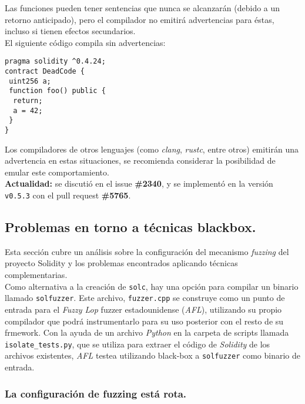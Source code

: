 Las funciones pueden tener sentencias que nunca se alcanzarán (debido a un retorno anticipado), pero el compilador no emitirá advertencias para éstas, incluso si tienen efectos secundarios.\\
 El siguiente código compila sin advertencias:

\begin{lstlisting}[language=Solidity, caption={Código de ejemplo para dead code}] 
pragma solidity ^0.4.24;
contract DeadCode {
 uint256 a;
 function foo() public {
  return;
  a = 42;
 }
}
\end{lstlisting}

Los compiladores de otros lenguajes (como \textit{clang}, \textit{rustc}, entre otros) emitirán una advertencia en estas situaciones, se recomienda considerar la posibilidad de emular este comportamiento.\\

\textbf{Actualidad:} se discutió en el issue \textbf{\#2340}\cite{GHI2340}, y se implementó en la versión \texttt{v0.5.3} con el pull request \textbf{\#5765}\cite{GHPR5765}.\\

\subsection{Problemas en torno a técnicas blackbox.}

Esta sección cubre un análisis sobre la configuración del mecanismo \textit{fuzzing} del proyecto Solidity y los problemas encontrados aplicando técnicas complementarias.\\

Como alternativa a la creación de \texttt{solc}, hay una opción para compilar un binario llamado \texttt{solfuzzer}. Este archivo, \texttt{fuzzer.cpp} se construye como un punto de entrada para el \textit{Fuzzy Lop} fuzzer estadounidense (\textit{AFL}), utilizando su propio compilador que podrá instrumentarlo para su uso posterior con el resto de su frmework. Con la ayuda de un archivo \textit{Python} en la carpeta de scripts llamada \texttt{isolate\_tests.py}\cite{GHisolatetests}, que se utiliza para extraer el código de \textit{Solidity} de los archivos existentes, \textit{AFL} testea utilizando black-box a \texttt{solfuzzer} como binario de entrada.\\


\subsubsection{La configuración de fuzzing está rota.}

